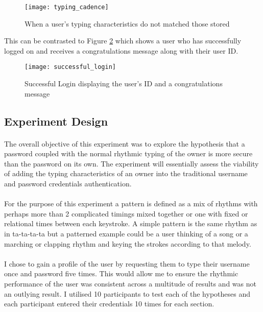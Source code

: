\documentclass{article}
\begin{document}
\begin{figure}[H]
    \centering
    \texttt{[image: typing\_cadence]}
    \caption{When a user's typing characteristics do not matched those stored}
    \label{fig:typing_cadence}
\end{figure}

This can be contrasted to Figure \ref{fig:successful_login} which shows a user who has successfully logged on and receives a congratulations message along with their user ID.

\begin{figure}[H]
    \centering
    \texttt{[image: successful\_login]}
    \caption{Successful Login displaying the user's ID and a congratulations message}
    \label{fig:successful_login}
\end{figure}

\subsection{Experiment Design}
\paragraph{}
The overall objective of this experiment was to explore the hypothesis that a password coupled with the normal rhythmic typing of the owner is more secure than the password on its own. The experiment will essentially assess the viability of adding the typing characteristics of an owner into the traditional username and password credentials authentication. 

\paragraph{}
For the purpose of this experiment a pattern is defined as a mix of rhythms with perhaps more than 2 complicated timings mixed together or one with fixed or relational times between each keystroke. A simple pattern is the same rhythm as in ta-ta-ta-ta but a patterned example could be a user thinking of a song or a marching or clapping rhythm and keying the strokes according to that melody. 

\paragraph{}
I chose to gain a profile of the user by requesting them to type their username once and password five times. This would allow me to ensure the rhythmic performance of the user was consistent across a multitude of results and was not an outlying result. I utilised 10 participants to test each of the hypotheses and each participant entered their credentials 10 times for each section. 
\end{document}
